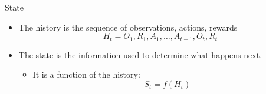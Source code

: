 \bgroup
\begin{frame}{State}
\begin{itemize}
\item The \textcolor{mImagelabRed}{history} is the sequence of observations, actions, rewards
\begin{equation*}
H_t = O_1, R_1, A_1, \ldots, A_{t-1}, O_t, R_t
\end{equation*}
\item The \textcolor{mImagelabRed}{state} is the information used to determine what happens next.
\begin{itemize}
\item It is a function of the history:
\begin{equation*}
S_t = f(H_t)
\end{equation*}
\end{itemize}
\end{itemize}
\end{frame}
\egroup